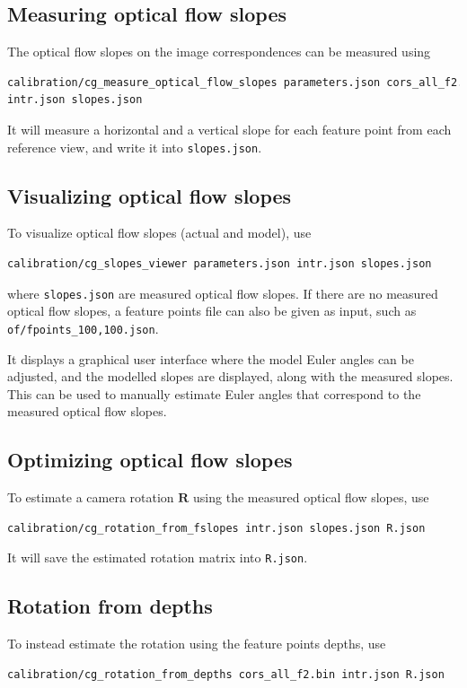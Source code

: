 \documentclass{scrreprt}
\newcommand{\matr}[1]{\mathbf{#1}}
\begin{document}
\subsection{Measuring optical flow slopes}
The optical flow slopes on the image correspondences can be measured using
\begin{lstlisting}[language=bash]
calibration/cg_measure_optical_flow_slopes parameters.json cors_all_f2.bin
intr.json slopes.json
\end{lstlisting}
It will measure a horizontal and a vertical slope for each feature point from each reference view, and write it into \texttt{slopes.json}.


\subsection{Visualizing optical flow slopes}
To visualize optical flow slopes (actual and model), use
\begin{lstlisting}[language=bash]
calibration/cg_slopes_viewer parameters.json intr.json slopes.json
\end{lstlisting}
where \texttt{slopes.json} are measured optical flow slopes. If there are no measured optical flow slopes, a feature points file can also be given as input, such as \texttt{of/fpoints\_100,100.json}.

It displays a graphical user interface where the model Euler angles can be adjusted, and the modelled slopes are displayed, along with the measured slopes. This can be used to manually estimate Euler angles that correspond to the measured optical flow slopes.


\subsection{Optimizing optical flow slopes}
To estimate a camera rotation $\matr{R}$ using the measured optical flow slopes, use
\begin{lstlisting}[language=bash]
calibration/cg_rotation_from_fslopes intr.json slopes.json R.json
\end{lstlisting}
It will save the estimated rotation matrix into \texttt{R.json}.


\subsection{Rotation from depths}
To instead estimate the rotation using the feature points depths, use
\begin{lstlisting}[language=bash]
calibration/cg_rotation_from_depths cors_all_f2.bin intr.json R.json
\end{lstlisting}
\end{document}
